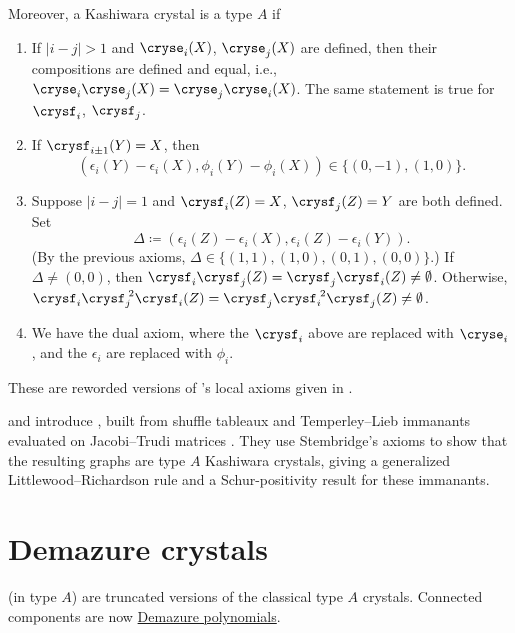 Moreover, a Kashiwara crystal is a type $A$
\label{stembridgeCrystal} if

\begin{enumerate}
\item If $|i-j| \gt 1$ and $\cryse_i(X)$, $\cryse_j(X)$ are defined, then
their compositions are defined and equal, i.e.,
$\cryse_i \cryse_j(X) = \cryse_j \cryse_i(X)$.  The same statement is true for
$\crysf_i$, $\crysf_j$.

\item If $\crysf_{i \pm 1}(Y) = X$, then 
\[
	 \left(\epsilon_i(Y) - \epsilon_i(X), \phi_i(Y) - \phi_i(X) \right)
   \in \{ (0,-1), (1,0) \}.
\]

\item Suppose $|i-j|=1$ and $\crysf_i(Z)=X$, $\crysf_j(Z)=Y$ are both defined.
Set
\[
 \Delta \coloneqq
 \left(\epsilon_i(Z) - \epsilon_i(X), \epsilon_i(Z) - \epsilon_i(Y) \right).
\]
(By the previous axioms, $\Delta \in \{ (1,1), (1,0), (0,1), (0,0) \}$.)
If $\Delta \neq (0,0)$, then
$\crysf_i \crysf_j(Z) = \crysf_j \crysf_i(Z) \neq \emptyset$.
Otherwise, 
$\crysf_i {\crysf}^{\;2}_j \crysf_i(Z) = \crysf_j {\crysf}^{\;2}_i \crysf_j(Z) \neq \emptyset$.

\item We have the dual axiom, where the $\crysf_i$ above are replaced with $\cryse_i$,
and the $\epsilon_i$ are replaced with $\phi_i$.
\end{enumerate}
These are reworded versions of 's local axioms given in \cite{Stembridge2003}.

 and  introduce
\label{temperleyLiebCrystal}, built from shuffle tableaux and
Temperley--Lieb immanants evaluated on Jacobi--Trudi matrices
\cite{NguyenPylyavskyy2024x}.  They use Stembridge's axioms to show that the
resulting graphs are type $A$ Kashiwara crystals, giving a generalized
Littlewood--Richardson rule and a Schur-positivity result for these
immanants.


\section[demazureCrystals]{Demazure crystals}

\label{demazureCrystal} (in type $A$) are truncated
versions of the classical type $A$ crystals.  Connected components are now
\hyperref[key]{Demazure polynomials}.

